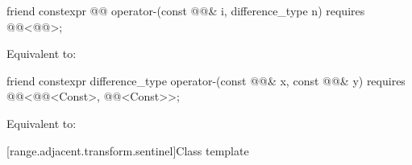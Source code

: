 %
\begin{itemdecl}
friend constexpr @@ operator-(const @@& i, difference_type n)
  requires @@<@@>;
\end{itemdecl}

\begin{itemdescr}
\pnum
\effects
Equivalent to: 
\end{itemdescr}

%
\begin{itemdecl}
friend constexpr difference_type operator-(const @@& x, const @@& y)
  requires @@<@@<Const>, @@<Const>>;
\end{itemdecl}

\begin{itemdescr}
\pnum
\effects
Equivalent to: 
\end{itemdescr}

[range.adjacent.transform.sentinel]{Class template }

